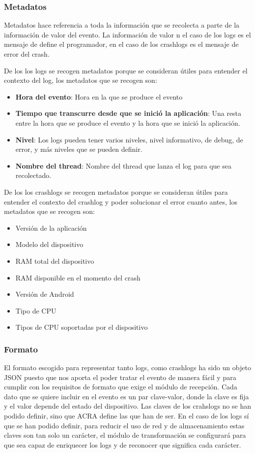 \subsubsection{Metadatos}
Metadatos hace referencia a toda la información que se recolecta a parte de la información de valor del evento. La información de valor n el caso de los logs es el mensaje de define el programador, en el caso de los crashlogs es el mensaje de error del crash.

De los los logs se recogen metadatos porque se consideran útiles para entender el contexto del log, los metadatos que se recogen son:

\begin{itemize}	
	\item \textbf{Hora del evento}: Hora en la que se produce el evento
	\item \textbf{Tiempo que transcurre desde que se inició la aplicación}: Una resta entre la hora que se produce el evento y la hora que se inició la aplicación.
	\item \textbf{Nivel}: Los logs pueden tener varios niveles, nivel informativo, de debug, de error, y más niveles que se pueden definir.
	\item \textbf{Nombre del thread}: Nombre del thread que lanza el log para que sea recolectado.
\end{itemize}

De los los crashlogs se recogen metadatos porque se consideran útiles para entender el contexto del crashlog y poder solucionar el error cuanto antes, los metadatos que se recogen son:

\begin{itemize}
	\item Versión de la aplicación
	\item Modelo del dispositivo
	\item RAM total del dispositivo
	\item RAM disponible en el momento del crash
	\item Versión de Android
	\item Tipo de CPU
	\item Tipos de CPU soportadas por el dispositivo
\end{itemize}

\subsubsection{Formato}
El formato escogido para representar tanto logs, como crashlogs ha sido un objeto JSON puesto que nos aporta el poder tratar el evento de manera fácil y para cumplir con los requisitos de formato que exige el módulo de recepción. Cada dato que se quiere incluir en el evento es un par clave-valor, donde la clave es fija y el valor depende del estado del dispositivo. Las claves de los crahslogs no se han podido definir, sino que ACRA define las que han de ser. En el caso de los logs sí que se han podido definir, para reducir el uso de red y de almacenamiento estas claves son tan solo un carácter, el módulo de transformación se configurará para que sea capaz de enriquecer los logs y de reconocer que significa cada carácter. 

